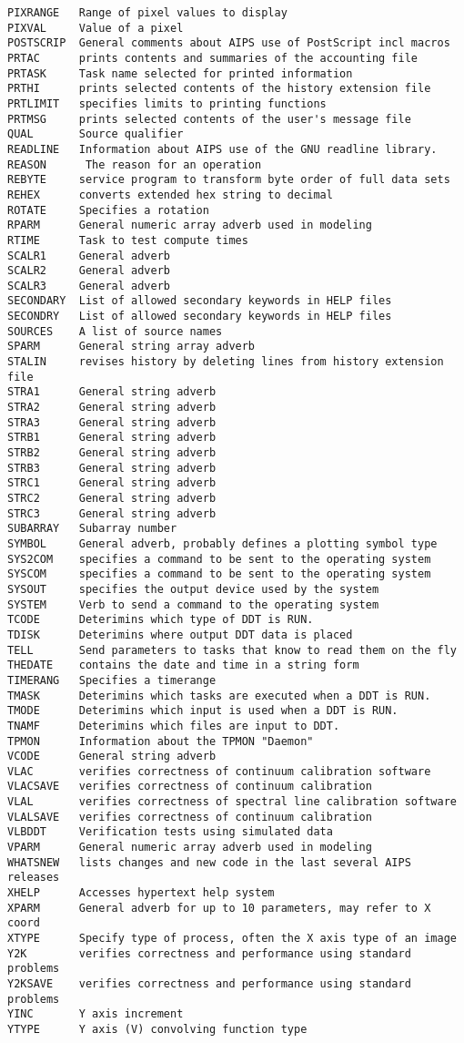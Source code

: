 \begin{verbatim}
PIXRANGE   Range of pixel values to display
PIXVAL     Value of a pixel
POSTSCRIP  General comments about AIPS use of PostScript incl macros
PRTAC      prints contents and summaries of the accounting file
PRTASK     Task name selected for printed information
PRTHI      prints selected contents of the history extension file
PRTLIMIT   specifies limits to printing functions
PRTMSG     prints selected contents of the user's message file
QUAL       Source qualifier
READLINE   Information about AIPS use of the GNU readline library.
REASON      The reason for an operation
REBYTE     service program to transform byte order of full data sets
REHEX      converts extended hex string to decimal
ROTATE     Specifies a rotation
RPARM      General numeric array adverb used in modeling
RTIME      Task to test compute times
SCALR1     General adverb
SCALR2     General adverb
SCALR3     General adverb
SECONDARY  List of allowed secondary keywords in HELP files
SECONDRY   List of allowed secondary keywords in HELP files
SOURCES    A list of source names
SPARM      General string array adverb
STALIN     revises history by deleting lines from history extension file
STRA1      General string adverb
STRA2      General string adverb
STRA3      General string adverb
STRB1      General string adverb
STRB2      General string adverb
STRB3      General string adverb
STRC1      General string adverb
STRC2      General string adverb
STRC3      General string adverb
SUBARRAY   Subarray number
SYMBOL     General adverb, probably defines a plotting symbol type
SYS2COM    specifies a command to be sent to the operating system
SYSCOM     specifies a command to be sent to the operating system
SYSOUT     specifies the output device used by the system
SYSTEM     Verb to send a command to the operating system
TCODE      Deterimins which type of DDT is RUN.
TDISK      Deterimins where output DDT data is placed
TELL       Send parameters to tasks that know to read them on the fly
THEDATE    contains the date and time in a string form
TIMERANG   Specifies a timerange
TMASK      Deterimins which tasks are executed when a DDT is RUN.
TMODE      Deterimins which input is used when a DDT is RUN.
TNAMF      Deterimins which files are input to DDT.
TPMON      Information about the TPMON "Daemon"
VCODE      General string adverb
VLAC       verifies correctness of continuum calibration software
VLACSAVE   verifies correctness of continuum calibration
VLAL       verifies correctness of spectral line calibration software
VLALSAVE   verifies correctness of continuum calibration
VLBDDT     Verification tests using simulated data
VPARM      General numeric array adverb used in modeling
WHATSNEW   lists changes and new code in the last several AIPS releases
XHELP      Accesses hypertext help system
XPARM      General adverb for up to 10 parameters, may refer to X coord
XTYPE      Specify type of process, often the X axis type of an image
Y2K        verifies correctness and performance using standard problems
Y2KSAVE    verifies correctness and performance using standard problems
YINC       Y axis increment
YTYPE      Y axis (V) convolving function type
\end{verbatim}\eve

